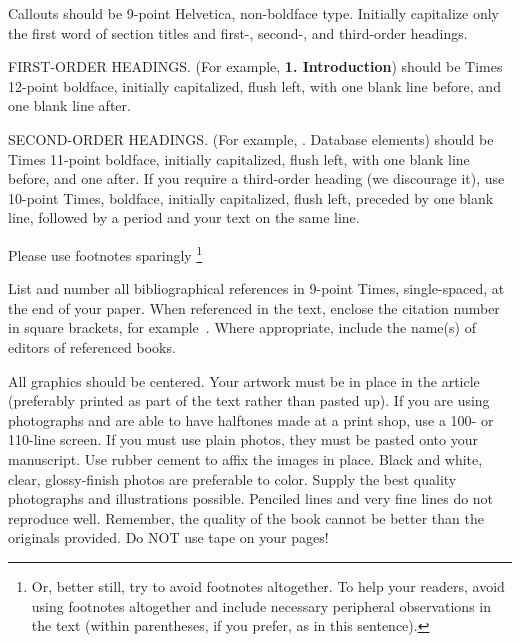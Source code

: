 \documentclass[times, 10pt,twocolumn]{article}
\begin{document}
\noindent Callouts should be 9-point Helvetica, non-boldface type. 
Initially capitalize only the first word of section titles and first-, 
second-, and third-order headings.

FIRST-ORDER HEADINGS. (For example, {\large \bf 1. Introduction}) 
should be Times 12-point boldface, initially capitalized, flush left, 
with one blank line before, and one blank line after.

SECOND-ORDER HEADINGS. (For example, {. Database elements}) 
should be Times 11-point boldface, initially capitalized, flush left, 
with one blank line before, and one after. If you require a third-order 
heading (we discourage it), use 10-point Times, boldface, initially 
capitalized, flush left, preceded by one blank line, followed by a period 
and your text on the same line.


Please use footnotes sparingly%
\footnote
   {%
     Or, better still, try to avoid footnotes altogether.  To help your 
     readers, avoid using footnotes altogether and include necessary 
     peripheral observations in the text (within parentheses, if you 
     prefer, as in this sentence).
   }

List and number all bibliographical references in 9-point Times, 
single-spaced, at the end of your paper. When referenced in the text, 
enclose the citation number in square brackets, for example~\cite{ex1}. 
Where appropriate, include the name(s) of editors of referenced books.


All graphics should be centered. Your artwork must be in place in the 
article (preferably printed as part of the text rather than pasted up). 
If you are using photographs and are able to have halftones made at a 
print shop, use a 100- or 110-line screen. If you must use plain photos, 
they must be pasted onto your manuscript. Use rubber cement to affix the 
images in place. Black and white, clear, glossy-finish photos are 
preferable to color. Supply the best quality photographs and 
illustrations possible. Penciled lines and very fine lines do not 
reproduce well. Remember, the quality of the book cannot be better than 
the originals provided. Do NOT use tape on your pages!
\end{document}

